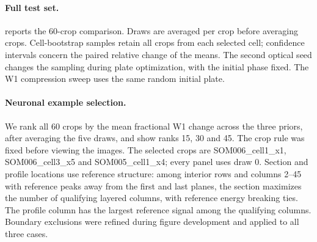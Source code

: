 \begin{table}[t]
\centering\small
\coltab{}
\caption{Re-evaluation differences from the earlier recorded reconstructions. PSNR differences are in dB and centroid differences in $\mu$m. The initial-profile group includes the strictly checked TV and descriptive PnP evaluations. The reported maxima include rows after the first-row checks.}
\label{tab:s:profilereproduction}
\end{table}

\paragraph{Full test set.}  reports the 60-crop comparison. Draws are averaged per crop before averaging crops. Cell-bootstrap samples retain all crops from each selected cell; confidence intervals concern the paired relative change of the means. The second optical seed changes the sampling during plate optimization, with the initial phase fixed. The W1 compression sweep uses the same random initial plate.

\begin{table}[t]
\centering\small

\caption{Reconstruction metrics from the same re-evaluations ($C=8$, 60 crops, five draws). W1 and centroid error are in $\mu$m; PSNR is in dB. Neuron-trained PnP uses the combined neuron-trained 2D and 3D denoising configuration.}
\label{tab:s:profilequality}
\end{table}

\paragraph{Neuronal example selection.} We rank all 60 crops by the mean fractional W1 change across the three priors, after averaging the five draws, and show ranks 15, 30 and 45. The crop rule was fixed before viewing the images. The selected crops are SOM006\_cell1\_x1, SOM006\_cell3\_x5 and SOM005\_cell1\_x4; every panel uses draw 0. Section and profile locations use reference structure: among interior rows and columns 2--45 with reference peaks away from the first and last planes, the section maximizes the number of qualifying layered columns, with reference energy breaking ties. The profile column has the largest reference signal among the qualifying columns. Boundary exclusions were refined during figure development and applied to all three cases.

